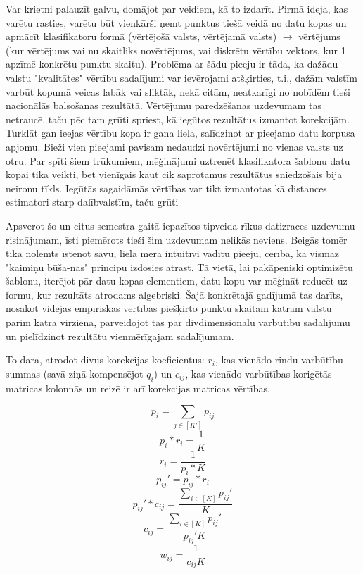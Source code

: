 \documentclass[12pt, a4paper]{article}
\begin{document}
Var krietni palauzīt galvu, domājot par veidiem, kā to izdarīt. Pirmā ideja, kas varētu rasties, varētu būt vienkārši ņemt punktus tiešā veidā no datu kopas un apmācīt klasifikatoru formā (vērtējošā valsts, vērtējamā valsts) $\rightarrow$ vērtējums (kur vērtējums vai nu skaitliks novērtējums, vai diskrētu vērtību vektors, kur 1 apzīmē konkrētu punktu skaitu). Problēma ar šādu pieeju ir tāda, ka dažādu valstu "kvalitātes" vērtību sadalījumi var ievērojami atšķirties, t.i., dažām valstīm varbūt kopumā veicas labāk vai sliktāk, nekā citām, neatkarīgi no nobīdēm tieši nacionālās balsošanas rezultātā. Vērtējumu paredzēšanas uzdevumam tas netraucē, taču pēc tam grūti spriest, kā iegūtos rezultātus izmantot korekcijām. Turklāt gan ieejas vērtību kopa ir gana liela, salīdzinot ar pieejamo datu korpusa apjomu. Bieži vien pieejami pavisam nedaudzi novērtējumi no vienas valsts uz otru. Par spīti šiem trūkumiem, mēģinājumi uztrenēt klasifikatora šablonu datu kopai tika veikti, bet vienīgais kaut cik saprotamus rezultātus sniedzošais bija neironu tīkls. Iegūtās sagaidāmās vērtības var tikt izmantotas kā distances estimatori starp dalībvalstīm, taču grūti

Apsverot šo un citus semestra gaitā iepazītos tipveida rīkus datizraces uzdevumu risinājumam, īsti piemērots tieši šim uzdevumam nelikās neviens. Beigās tomēr tika nolemts īstenot savu, lielā mērā intuitīvi vadītu pieeju, cerībā, ka vismaz "kaimiņu būša-nas" principu izdosies atrast. Tā vietā, lai pakāpeniski optimizētu šablonu, iterējot pār datu kopas elementiem, datu kopu var mēģināt reducēt uz formu, kur rezultāts atrodams algebriski. Šajā konkrētajā gadījumā tas darīts, nosakot vidējās empīriskās vērtības piešķirto punktu skaitam katram valstu pārim katrā virzienā, pārveidojot tās par divdimensionālu varbūtību sadalījumu un pielīdzinot rezultātu vienmērīgajam sadalījumam. 

To dara, atrodot divus korekcijas koeficientus: $r_i$, kas vienādo rindu varbūtību summas (savā ziņā kompensējot $q_i$) un $c_{ij}$, kas vienādo varbūtības koriģētās matricas kolonnās un reizē ir arī korekcijas matricas vērtības. 

\begin{equation}
    p_i=\sum_{j\in [K']}p_{ij}
\end{equation}
\begin{equation}
    p_i*r_i=\frac{1}{K}
\end{equation}
\begin{equation}
    r_i = \frac{1}{p_i*K}
\end{equation}
\begin{equation}
    p_{ij}'=p_{ij}*r_i
\end{equation}
\begin{equation}
    p_{ij}'*c_{ij}=\frac{\sum_{i\in[K]}p_{ij}'}{K}
\end{equation}
\begin{equation}
    c_{ij}=\frac{\sum_{i\in[K]}p_{ij}'}{p_{ij}'K}
\end{equation}
\begin{equation}
    w_{ij}=\frac{1}{c_{ij}K}
\end{equation}
\end{document}
